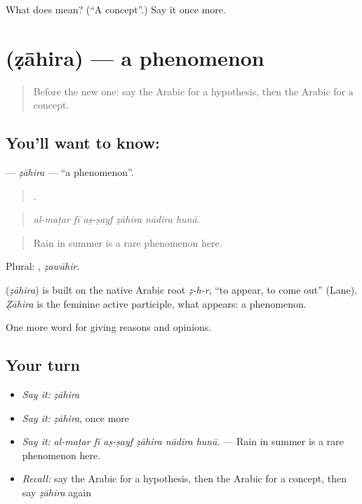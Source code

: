\begin{tcolorbox}[breakable,colback=teal!4,colframe=teal!35!black,title={Before you move on}]
What does  mean? (\textquotedblleft{}A concept\textquotedblright{}.) Say it once more.
\end{tcolorbox}
\section[\texorpdfstring{\ar{ظاهرة} (ẓāhira)}{ظاهرة (ẓāhira)}]{ (ẓāhira) — a phenomenon}

\label{lesson:AR-C363-zahira}



\begin{quote}
Before the new one: say the Arabic for a hypothesis, then the Arabic for a concept.
\end{quote}

\subsection*{You'll want to know: }
\textbf{} — \emph{ẓāhira} — \textquotedblleft{}a phenomenon\textquotedblright{}.

\begin{quote}
     .
\end{quote}

\begin{quote}
\emph{al-maṭar fī aṣ-ṣayf ẓāhira nādira hunā.}
\end{quote}

\begin{quote}
Rain in summer is a rare phenomenon here.
\end{quote}

Plural: , \emph{ẓawāhir}.

\begin{cousinweb}
\textbf{} (\emph{ẓāhira}) is built on the native Arabic root \emph{ẓ-h-r}, \textquotedblleft{}to appear, to come out\textquotedblright{} (Lane). \emph{Ẓāhira} is the feminine active participle, what appears: a phenomenon.
\end{cousinweb}

\begin{grammarlens}[title={What you've built}]
One more word for giving reasons and opinions.
\end{grammarlens}

\subsection*{Your turn}
\begin{itemize}
\raggedright
  \item \emph{Say it:} \emph{ẓāhira}
  \item \emph{Say it:} \emph{ẓāhira}, once more
  \item \emph{Say it:} \emph{al-maṭar fī aṣ-ṣayf ẓāhira nādira hunā.} — Rain in summer is a rare phenomenon here.
  \item \emph{Recall:} say the Arabic for a hypothesis, then the Arabic for a concept, then say \emph{ẓāhira} again
\end{itemize}


